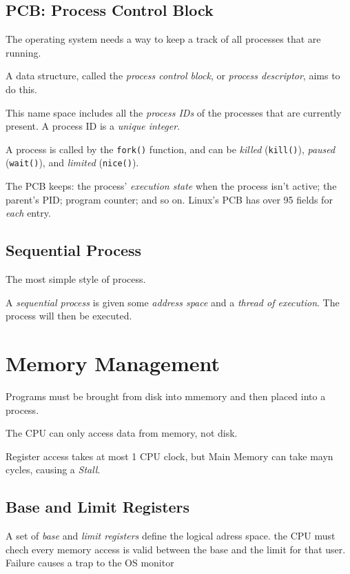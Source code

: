 \documentclass{article}
\begin{document}
\subsection{PCB: Process Control Block}

The operating system needs a way to keep a track of all processes that are running.

A data structure, called the \textit{process control block}, or \textit{process descriptor}, aims to do this.

This name space includes all the \textit{process IDs} of the processes that are currently present. A process ID is a \textit{unique integer}.

A process is called by the \texttt{fork()} function, and can be \textit{killed} (\texttt{kill()}), \textit{paused} (\texttt{wait()}), and \textit{limited} (\texttt{nice()}).

The PCB keeps: the process' \textit{execution state} when the process isn't active; the parent's PID; program counter; and so on. Linux's PCB has over 95 fields for \textit{each} entry.

\subsection{Sequential Process}

The most simple style of process.

A \textit{sequential process} is given some \textit{address space} and a \textit{thread of execution}. The process will then be executed.

\section{Memory Management}
Programs must be brought from disk into mmemory and then placed into a process.

The CPU can only access data from memory, not disk.

Register access takes at most 1 CPU clock, but Main Memory can take mayn cycles, causing a \emph{Stall}.

\subsection{Base and Limit Registers}
A set of \emph{base} and \emph{limit registers} define the logical adress space. the CPU must chech every
memory access is valid between the base and the limit for that user. Failure causes a trap to the OS monitor
\end{document}
